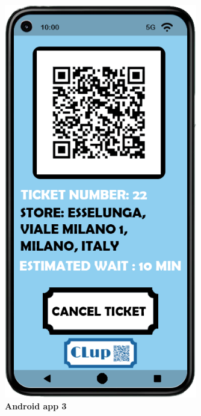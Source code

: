 \begin{figure}[!h]
\centering
\begin{minipage}{0.4\textwidth}
\centering
\includegraphics[width=0.75\textwidth]{Images/App/Android_RequestTicket}
\caption{\label{fig:android3}\textbf{Android app 3}}
\end{minipage}
\begin{minipage}{0.4\textwidth}
\centering

\end{minipage}
\end{figure}
